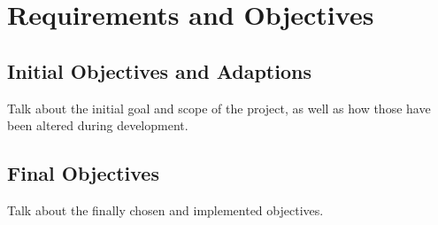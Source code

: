 \chapter{Requirements and Objectives}
\section{Initial Objectives and Adaptions}
Talk about the initial goal and scope of the project, as well as how those have
been altered during development.

\section{Final Objectives}
Talk about the finally chosen and implemented objectives.
